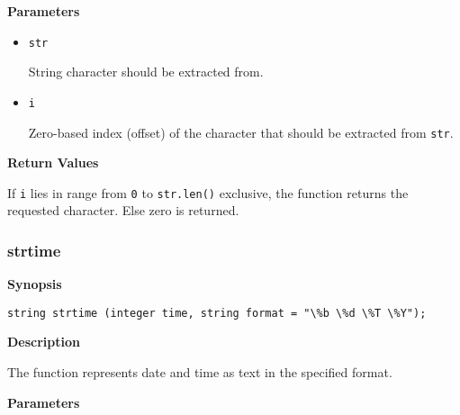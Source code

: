 \documentclass[a4paper, 10pt, titlepage]{article}
\begin{document}
\textbf{Parameters}

\begin{itemize}
\item \texttt{str}

String character should be extracted from.

\item \texttt{i}

Zero-based index (offset) of the character that should be extracted from \texttt{str}.
\end{itemize}

\textbf{Return Values}

If \texttt{i} lies in range from \texttt{0} to \texttt{str.len()} exclusive, the function returns the requested character. Else zero is returned.

\subsubsection{strtime}

\textbf{Synopsis}

\begin{verbatim}
string strtime (integer time, string format = "\%b \%d \%T \%Y");
\end{verbatim}

\textbf{Description}

The function represents date and time as text in the specified format.

\textbf{Parameters}
\end{document}
